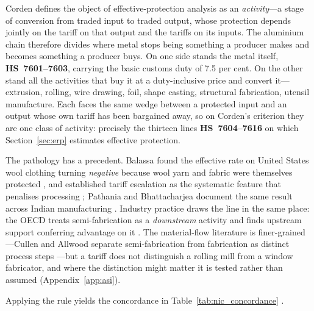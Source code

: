 Corden \cite{corden1966} defines the object of effective-protection analysis as an \emph{activity}---a stage of conversion from traded input to traded output, whose protection depends jointly on the tariff on that output and the tariffs on its inputs. The aluminium chain therefore divides where metal stops being something a producer makes and becomes something a producer buys. On one side stands the metal itself, \textbf{HS~7601--7603}, carrying the basic customs duty of 7.5 per cent. On the other stand all the activities that buy it at a duty-inclusive price and convert it---extrusion, rolling, wire drawing, foil, shape casting, structural fabrication, utensil manufacture. Each faces the same wedge between a protected input and an output whose own tariff has been bargained away, so on Corden's criterion they are one class of activity: precisely the thirteen lines \textbf{HS~7604--7616} on which Section~\ref{sec:erp} estimates effective protection.

The pathology has a precedent. Balassa found the effective rate on United States wool clothing turning \emph{negative} because wool yarn and fabric were themselves protected \cite{balassa1965}, and established tariff escalation as the systematic feature that penalises processing \cite{balassa1968}; Pathania and Bhattacharjea document the same result across Indian manufacturing \cite{pathania2020}. Industry practice draws the line in the same place: the OECD treats semi-fabrication as a \emph{downstream} activity and finds upstream support conferring advantage on it \cite{oecd2019}. The material-flow literature is finer-grained---Cullen and Allwood separate semi-fabrication from fabrication as distinct process steps \cite{cullen2013,bertram2009}---but a tariff does not distinguish a rolling mill from a window fabricator, and where the distinction might matter it is tested rather than assumed (Appendix~\ref{app:asi}).

Applying the rule yields the concordance in Table~\ref{tab:nic_concordance} \cite{nic2008}.

